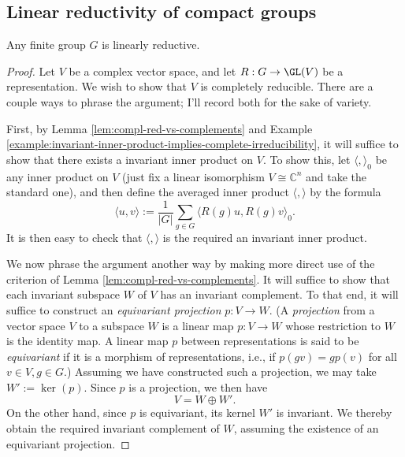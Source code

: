 \documentclass[reqno]{amsart} 
\begin{document}
\subsection{Linear reductivity of compact groups\label{sec:linear-reductivity-compact-groups}}
\label{sec:org7d9bd5a}
\begin{theorem}[Maschke]\label{thm:maschke-finite-groups}
  Any finite group $G$ is linearly reductive.
\end{theorem}
\begin{proof}
  Let $V$ be a complex vector space,
  and let $R : G \rightarrow \GL(V)$ be a representation.
  We wish to show that $V$ is completely reducible.
  There are a couple ways to phrase the argument; I'll record
  both
  for the sake of variety.

  First, by Lemma \ref{lem:compl-red-vs-complements}
  and Example
  \ref{example:invariant-inner-product-implies-complete-irreducibility},
  it will suffice to show that there exists
  a invariant inner product on $V$.
  To show this, let $\langle , \rangle_0$ be any inner product
  on $V$
  (just fix a linear isomorphism $V \cong \mathbb{C}^n$ and take
  the standard one),
  and then define  the averaged inner product $\langle ,
  \rangle$
  by the formula
  \begin{equation*}
    \langle u, v \rangle := \frac{1}{|G|}
    \sum_{g \in G}
    \langle R(g) u, R(g) v \rangle_0.
  \end{equation*}
  It is then easy to check that $\langle , \rangle$ is the
  required an invariant inner product.

  We now phrase the argument another way
  by making more direct use
  of the criterion of Lemma \ref{lem:compl-red-vs-complements}.
  It will suffice to show that each invariant subspace
  $W$ of $V$ has an invariant complement.
  To that end, it will suffice to construct an \emph{equivariant
    projection} $p : V \rightarrow W$.
  (A \emph{projection} from a vector space
  $V$ to a subspace $W$ is a linear map $p : V \rightarrow W$ whose
  restriction to $W$ is the identity map.
  A linear map $p$ between representations is said to be
  \emph{equivariant}
  if it is a morphism of representations, i.e.,
  if $p(g v) = g p(v)$ for all $v \in V, g \in G$.)
  Assuming we have constructed such a projection,
  we may take $W' := \ker(p)$.
  Since $p$ is a projection, we then have
  \begin{equation*}
    V = W \oplus W'.
  \end{equation*}
  On the other hand, since $p$ is equivariant,
  its kernel $W'$ is invariant.
  We thereby obtain the required invariant complement of $W$,
  assuming the existence
  of an equivariant projection.


\end{proof}
\end{document}
